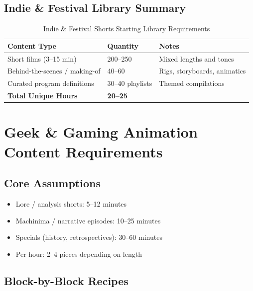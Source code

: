 \documentclass[12pt,letterpaper,twoside]{report}
\begin{document}
\subsection{Indie \& Festival Library Summary}

\begin{table}[H]
\centering
\caption{Indie \& Festival Shorts Starting Library Requirements}
\label{tab:indie-library}
\begin{tabular}{@{}L{6cm}R{3cm}L{5cm}@{}}
\toprule
\textbf{Content Type} & \textbf{Quantity} & \textbf{Notes} \\
\midrule
Short films (3--15 min) & 200--250 & Mixed lengths and tones \\
Behind-the-scenes / making-of & 40--60 & Rigs, storyboards, animatics \\
Curated program definitions & 30--40 playlists & Themed compilations \\
\midrule
\textbf{Total Unique Hours} & \textbf{20--25} & \\
\bottomrule
\end{tabular}
\end{table}

\section{Geek \& Gaming Animation Content Requirements}

\subsection{Core Assumptions}

\begin{itemize}[leftmargin=1.5cm]
    \item Lore / analysis shorts: 5--12 minutes
    \item Machinima / narrative episodes: 10--25 minutes
    \item Specials (history, retrospectives): 30--60 minutes
    \item Per hour: 2--4 pieces depending on length
\end{itemize}

\subsection{Block-by-Block Recipes}
\end{document}
